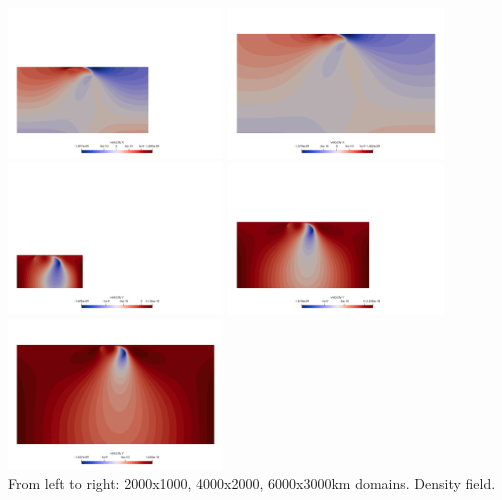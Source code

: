 \begin{center}
\includegraphics[width=5.7cm]{python_codes/fieldstone_55/gamma100/vx_medium}
\includegraphics[width=5.7cm]{python_codes/fieldstone_55/gamma100/vx_large}\\
\includegraphics[width=5.7cm]{python_codes/fieldstone_55/gamma100/vy_small}
\includegraphics[width=5.7cm]{python_codes/fieldstone_55/gamma100/vy_medium}
\includegraphics[width=5.7cm]{python_codes/fieldstone_55/gamma100/vy_large}\\
{\captionfont From left to right: 2000x1000, 4000x2000, 6000x3000km domains. Density field.}
\end{center}

